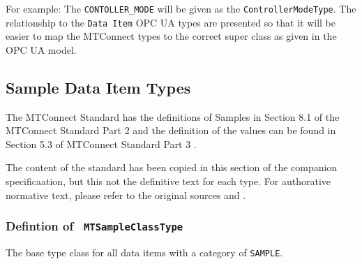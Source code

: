 For example: The \texttt{CONTOLLER_MODE} will be given as the \texttt{ControllerModeType}. 
The relationship to the \texttt{Data Item} OPC UA types are presented so that it will be
easier to map the MTConnect types to the correct super class as given in the OPC UA model.

\subsection{Sample Data Item Types} \label{model:SampleDataItemTypes}

The MTConnect Standard has the definitions of Samples in 
Section 8.1 of the MTConnect Standard Part 2 \cite{MTCPart2} and the 
definition of the values can be found in Section 5.3 of MTConnect Standard Part 3 \cite{MTCPart3}. 

The content of the standard has been copied in this section of the companion specificaation,
but this not the definitive text for each type. For authorative normative text, please refer 
to the original sources \cite{MTCPart2} and \cite{MTCPart3}.

\subsubsection{Defintion of \texttt{ MTSampleClassType}}
  \label{type:MTSampleClassType}

\FloatBarrier

The base type class for all data items with a category of \texttt{SAMPLE}.

